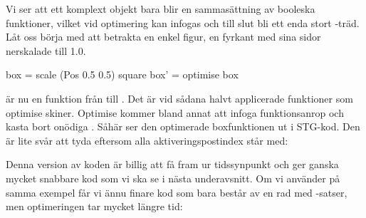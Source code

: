 \documentclass[Rapport]{subfiles}
\begin{document}
Vi ser att ett komplext objekt bara blir en sammasättning av booleska 
funktioner, vilket vid optimering kan infogas och till slut bli ett enda stort -träd. 
Låt oss börja med att betrakta en enkel figur, en fyrkant med sina sidor
nerskalade till 1.0.

\begin{codeEx}
box  = scale (Pos 0.5 0.5) square
box' = optimise box
\end{codeEx}

 är nu en funktion från  till . Det är vid sådana halvt applicerade funktioner
som optimise skiner. Optimise kommer bland annat att infoga funktionsanrop och kasta bort onödiga . 
Såhär ser den optimerade boxfunktionen ut i STG-kod. Den är lite svår att tyda 
eftersom alla aktiveringspostindex står med:
 


Denna version av koden är billig att få fram ur tidssynpunkt och ger ganska
mycket snabbare kod som vi ska se i nästa underavsnitt. Om vi använder 
på samma exempel får vi ännu finare kod som bara består av en rad med -satser,
men optimeringen tar mycket längre tid:
\end{document}
